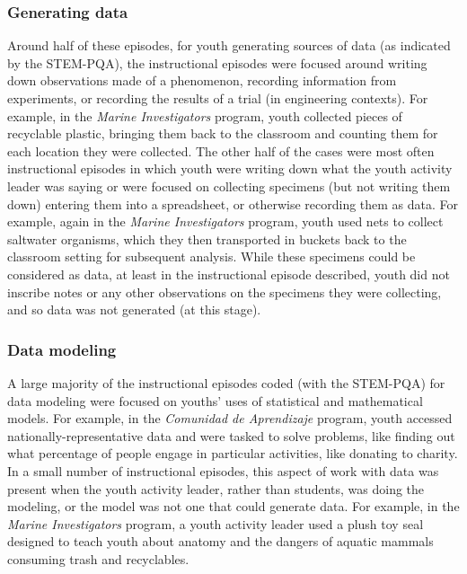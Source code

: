 \documentclass[]{book}
\theoremstyle{definition}
\theoremstyle{definition}
\theoremstyle{definition}
\theoremstyle{remark}
\begin{document}
\subsubsection{Generating data}\label{generating-data}

Around half of these episodes, for youth generating sources of data (as
indicated by the STEM-PQA), the instructional episodes were focused
around writing down observations made of a phenomenon, recording
information from experiments, or recording the results of a trial (in
engineering contexts). For example, in the \emph{Marine Investigators}
program, youth collected pieces of recyclable plastic, bringing them
back to the classroom and counting them for each location they were
collected. The other half of the cases were most often instructional
episodes in which youth were writing down what the youth activity leader
was saying or were focused on collecting specimens (but not writing them
down) entering them into a spreadsheet, or otherwise recording them as
data. For example, again in the \emph{Marine Investigators} program,
youth used nets to collect saltwater organisms, which they then
transported in buckets back to the classroom setting for subsequent
analysis. While these specimens could be considered as data, at least in
the instructional episode described, youth did not inscribe notes or any
other observations on the specimens they were collecting, and so data
was not generated (at this stage).

\subsubsection{Data modeling}\label{data-modeling}

A large majority of the instructional episodes coded (with the STEM-PQA)
for data modeling were focused on youths' uses of statistical and
mathematical models. For example, in the \emph{Comunidad de Aprendizaje}
program, youth accessed nationally-representative data and were tasked
to solve problems, like finding out what percentage of people engage in
particular activities, like donating to charity. In a small number of
instructional episodes, this aspect of work with data was present when
the youth activity leader, rather than students, was doing the modeling,
or the model was not one that could generate data. For example, in the
\emph{Marine Investigators} program, a youth activity leader used a
plush toy seal designed to teach youth about anatomy and the dangers of
aquatic mammals consuming trash and recyclables.
\end{document}
